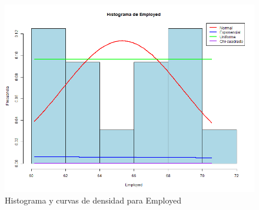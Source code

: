 \documentclass{article}
\begin{document}
\begin{figure}[H]
    \centering
    \includegraphics[width=\textwidth]{HistogramasDensidad/histograma_Employed.png}
    \caption{Histograma y curvas de densidad para Employed}
\end{figure}
\end{document}
